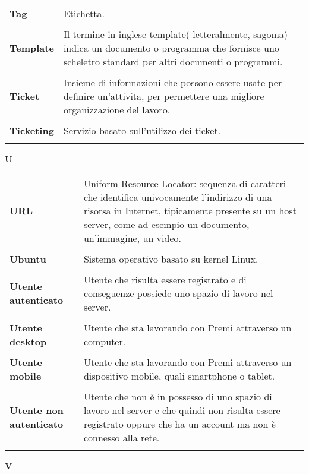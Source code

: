 {\begin{longtable}{L{4cm} p{10cm}}
 \\ 
\textbf{Tag} & Etichetta. \\ 
 \\ 
\textbf{Template} & Il termine in inglese template( letteralmente, sagoma) indica un documento o programma che fornisce uno scheletro standard per altri documenti o programmi. \\ 
 \\ 
\textbf{Ticket} & Insieme di informazioni che possono essere usate per definire un’attivita, per permettere una migliore organizzazione del lavoro. \\ 
 \\ 
\textbf{Ticketing} & Servizio basato sull’utilizzo dei ticket. \\ 
 \\ 
\end{longtable} 
\newpage 
{} 
{} 
\hfill\Huge{\textbf{U}} \\ 
\normalsize 
\begin{longtable}{L{4cm} p{10cm}}
\textbf{URL} & Uniform Resource Locator: sequenza di caratteri che identifica univocamente l'indirizzo di una risorsa in Internet, tipicamente presente su un host server, come ad esempio un documento, un'immagine, un video. \\ 
 \\ 
\textbf{Ubuntu} & Sistema operativo basato su kernel Linux. \\ 
 \\ 
\textbf{Utente autenticato} & Utente che risulta essere registrato e di conseguenze possiede uno spazio di lavoro nel server. \\ 
 \\ 
\textbf{Utente desktop} & Utente che sta lavorando con Premi attraverso un computer. \\ 
 \\ 
\textbf{Utente mobile} & Utente che sta lavorando con Premi attraverso un dispositivo mobile, quali smartphone o tablet. \\ 
 \\ 
\textbf{Utente non autenticato} & Utente che non è in possesso di uno spazio di lavoro nel server e che quindi non risulta essere registrato oppure che ha un account ma non è connesso alla rete. \\ 
 \\ 
\end{longtable} 
\newpage 
{} 
{} 
\hfill\Huge{\textbf{V}} \\ 
}
